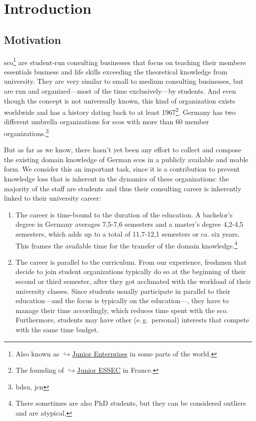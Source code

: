 \documentclass[a4paper, DIV=13, BCOR=0cm]{scrbook}
\newcommand{\eg}{e.\,g.\ }
\newcommand{\link}[2]{\href{#1}{$\hookrightarrow$#2}}
\begin{document}

\tableofcontents
\newpage

\mainmatter
\chapter{Introduction}
\section{Motivation }
\gls{sco}\footnote{Also known as \link{https://en.wikipedia.org/wiki/Junior_enterprise}{Junior Enterprises} in some parts of the world.} are student-run consulting businesses that focus on teaching their members essentials business and life skills exceeding the theoretical knowledge from university. They are very similar to small to medium consulting businesses, but are run and organized---most of the time exclusively---by students. And even though the concept is not universally known, this kind of organization exists worldwide and has a history dating back to at least 1967\footnote{The founding of \link{https://www.en.junioressec.com/}{Junior ESSEC} in France.}. Germany has two different umbrella organizations for \glspl{sco} with more than 60 member organizations.\footnote{\gls{bdsu}, \gls{jcn}}

But as far as we know, there hasn't yet been any effort to collect and compose the existing domain knowledge of German \glspl{sco} in a publicly available and usable form. We consider this an important task, since it is a contribution to prevent knowledge loss that is inherent in the dynamics of these organizations: the majority of the staff are students and thus their consulting career is inherently linked to their university career:

\begin{enumerate}
	\item The career is time-bound to the duration of the education. A bachelor's degree in Germany averages 7,5-7,6 semesters and a master's degree 4,2-4,5 semesters, which adds up to a total of 11,7-12,1 semesters or ca. six years. \cite{stabu2019a} This frames the available time for the transfer of the domain knowledge.\footnote{There sometimes are also PhD students, but they can be considered outliers and are atypical.}
	\item The career is parallel to the curriculum. From our experience, freshmen that decide to join student organizations typically do so at the beginning of their second or third semester, after they got acclimated with the workload of their university classes. Since students usually participate in parallel to their education---and the focus is typically on the education---, they have to manage their time accordingly, which reduces time spent with the \gls{sco}. Furthermore, students may have other (\eg personal) interests that compete with the same time budget.
\end{enumerate}
\end{document}
